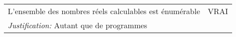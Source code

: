 \begin{tabular}{p{13cm}|l}
     L'ensemble des nombres réels calculables est énumérable & VRAI \\
     \textit{Justification:} Autant que de programmes & \\
    
\end{tabular}